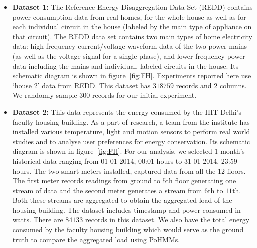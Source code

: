 \documentclass{acm_proc_article-sp}
\begin{document}
\begin{itemize}
\item \textbf{Dataset 1:} The Reference Energy Disaggregation Data Set (REDD) contains power consumption data from real homes, for the whole house as well as for each individual circuit in
the house (labeled by the main type of appliance on that circuit). %
The REDD data set contains two main types of home electricity data: high-frequency current/voltage waveform data of the two power mains (as well as the voltage signal for a single phase), and lower-frequency power data including the mains and individual, labeled circuits in the house. Its schematic diagram is shown in figure~\ref{fig:FH}.
Experiments reported here use `house 2' data from REDD. This dataset has $318759$ records and $2$ columns. We randomly sample $300$ records for our initial experiment.

\item \textbf{Dataset 2:} This data represents the energy consumed by the IIIT Delhi's faculty housing building. As a part of research, a team from the institute has installed various temperature, light and motion sensors to perform real world studies and to analyse user preferences for energy conservation. Its schematic diagram is shown in figure~\ref{fig:FH}. For our analysis, we selected $1$ month's historical data ranging from 01-01-2014, 00:01 hours to 31-01-2014, 23:59 hours. The two smart meters installed, captured data from all the $12$ floors. The first meter records readings from ground to $5$th floor generating one stream of data and the second meter generates a stream from $6$th to $11$th. Both these streams are aggregated to obtain the aggregated load of the housing building. The dataset includes timestamp and power consumed in watts. There are $84133$ records in this dataset. We also have the total energy consumed by the faculty housing building which would serve as the ground truth to compare the aggregated load using PoHMMs. 


\end{itemize}
\end{document}
